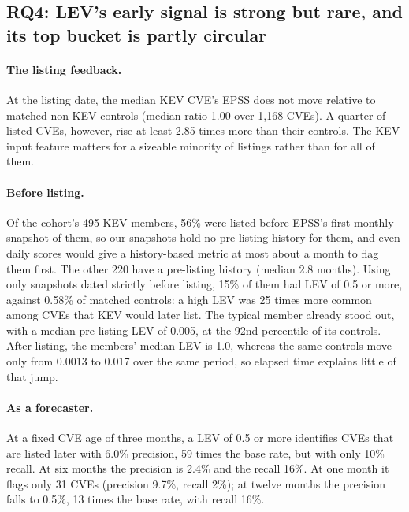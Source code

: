 \subsection{RQ4: LEV's early signal is strong but rare, and its top bucket is partly circular}\label{sec:res-leak}

\paragraph{The listing feedback.} At the listing date, the median KEV CVE's
EPSS does not move relative to matched non-KEV controls (median ratio 1.00 over
1,168 CVEs). A quarter of listed CVEs, however, rise at least 2.85 times more
than their controls. The KEV input feature matters for a sizeable minority of
listings rather than for all of them.

\paragraph{Before listing.} Of the cohort's 495 KEV members, 56\% were listed
before EPSS's first monthly snapshot of them, so our snapshots hold no
pre-listing history for them, and even daily scores would give a history-based
metric at most about a month to flag them first. The other 220 have a pre-listing history (median
2.8 months). Using only snapshots dated strictly before listing, 15\% of them
had LEV of 0.5 or more, against 0.58\% of matched controls: a high LEV was 25
times more common among CVEs that KEV would later list. The typical member
already stood out, with a median pre-listing LEV of 0.005, at the 92nd
percentile of its controls. After listing, the members' median LEV is 1.0,
whereas the same controls move only from 0.0013 to 0.017 over the same period,
so elapsed time explains little of that jump.

\paragraph{As a forecaster.} At a fixed CVE age of three months, a LEV of 0.5
or more identifies CVEs that are listed later with 6.0\% precision, 59 times
the base rate, but with only 10\% recall. At six months the precision is 2.4\%
and the recall 16\%. At one month it flags only 31 CVEs (precision 9.7\%,
recall 2\%); at twelve months the precision falls to 0.5\%, 13 times the base
rate, with recall 16\%.


